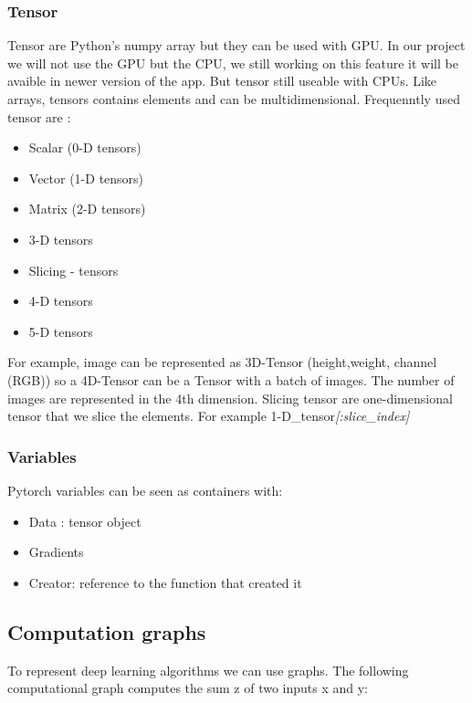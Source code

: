 \subsubsection{Tensor}
Tensor are Python's numpy array but they can be used with GPU. In our project we will not use the GPU but the CPU, we still working on this feature it will be avaible in newer version of the app. But tensor still useable with CPUs. 
\newline Like arrays, tensors contains elements and can be multidimensional. Frequenntly used tensor are :
\begin{itemize}
    \item Scalar (0-D tensors)
    \item Vector (1-D tensors)
    \item Matrix (2-D tensors)
    \item 3-D tensors
    \item Slicing - tensors
    \item 4-D tensors
    \item 5-D tensors
\end{itemize}

For example, image can be represented as 3D-Tensor (height,weight, channel (RGB)) so a 4D-Tensor can be a Tensor with a batch of images. The number of images are represented in the 4th dimension. Slicing tensor are one-dimensional tensor that we slice the elements. For example 1-D\_tensor\textit{[:slice\_index]}   

\subsubsection{Variables}
Pytorch variables can be seen as containers with:
\begin{itemize}
    \item Data : tensor object
    \item Gradients
    \item Creator: reference to the function that created it
\end{itemize}

\subsection{Computation graphs}
To represent deep learning algorithms we can use graphs. The following computational graph computes the sum z of two inputs x and y:

